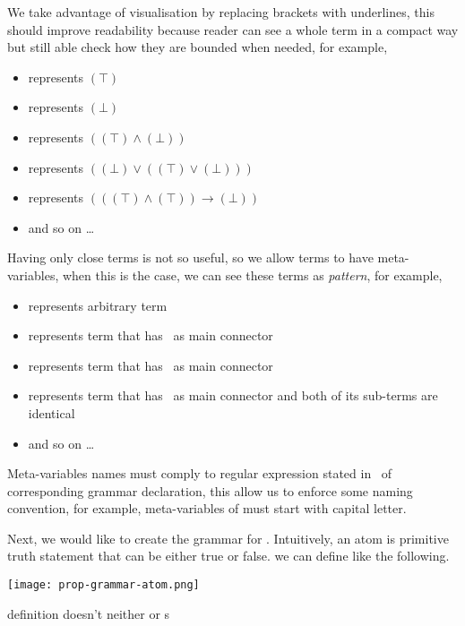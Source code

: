 \documentclass[master.tex]{subfiles}
\begin{document}
We take advantage of visualisation by replacing brackets with underlines, this
should improve readability because reader can see a whole term in a compact
way but still able check how they are bounded when needed, for example,
\begin{itemize}
  \item \propTop{} represents $(\top)$
  \item \propBot{} represents $(\bot)$
  \item \bat{\propTop\propAnd\propBot} represents $((\top) \wedge (\bot))$
  \item \bat{\propBot\propOr\bat{\propTop\propOr\propBot}}
    represents $((\bot) \vee ((\top) \vee (\bot)))$
  \item \bat{\bat{\propTop\propAnd\propTop}\propImp\propBot}
    represents $(((\top) \wedge (\top)) \rightarrow (\bot))$
  \item and so on \dots
\end{itemize}

Having only close terms is not so useful, so we allow terms to have
meta-variables, when this is the case, we can see these terms as \emph{pattern},
for example,
\begin{itemize}
  \item {} represents arbitrary  term
  \item {} represents  term that has
    \propNot\ as main connector
  \item {} represents  term that has
    \propAnd\ as main connector
  \item {} represents  term that has
    \propAnd\ as main connector and both of its sub-terms are identical
  \item and so on \dots
\end{itemize}

Meta-variables names must comply to regular expression stated in \kVarRegex\ of
corresponding grammar declaration, this allow us to enforce some naming
convention, for example, meta-variables of  must start with capital
letter.

Next, we would like to create the grammar for . Intuitively, an atom
is primitive truth statement that can be either true or false. we can define
 like the following.

\centerline{\texttt{[image: prop-grammar-atom.png]}}

 definition doesn't neither \kMetaVarRegex{} or \kChoice{}s
\end{document}

